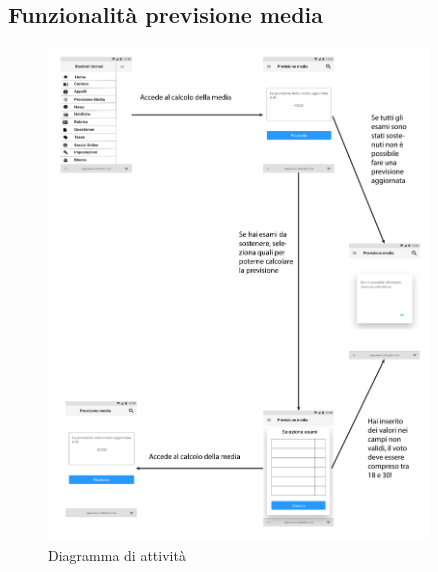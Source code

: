 \subsection{Funzionalità previsione media}
\begin{figure}[H]
	\centering
	\includegraphics[width=0.9\textwidth]{imgs/gruppo3/media-activity-diagram.pdf}
	\caption{Diagramma di attività}
	\label{fig:act-rubrica}
\end{figure}

\clearpage